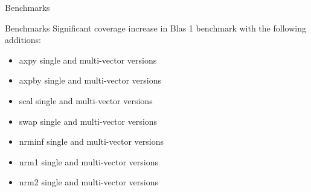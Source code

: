 \begin{frame}[fragile]

  {\Huge Benchmarks}

  \vspace{10pt}

\end{frame}

\begin{frame}[fragile]{Benchmarks}
  Significant coverage increase in Blas 1 benchmark with the following additions:
  \begin{itemize}
  \item {\ttfamily axpy} single and multi-vector versions
  \item {\ttfamily axpby} single and multi-vector versions
  \item {\ttfamily scal} single and multi-vector versions
  \item {\ttfamily swap} single and multi-vector versions
  \item {\ttfamily nrminf} single and multi-vector versions
  \item {\ttfamily nrm1} single and multi-vector versions
  \item {\ttfamily nrm2} single and multi-vector versions
  \end{itemize}
\end{frame}
